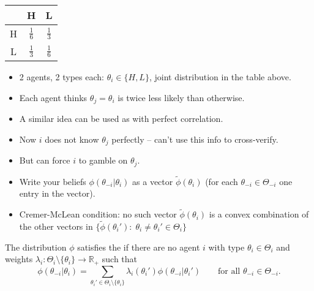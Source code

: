 \documentclass[english,handout,10pt]{beamer}		%
\def\lyxframeend{} %
\begin{document}
\begin{example}[2x2 example]
	\begin{center}
		\begin{tabular}{c | c | c |}
				& H 				& L					\\ \hline
			H	& $\frac{1}{6}$ 	& $\frac{1}{3}$ 	\\ \hline
			L	& $\frac{1}{3}$ 	& $\frac{1}{6}$		\\ \hline
		\end{tabular}
	\end{center}
	\begin{itemize}
		\item 2 agents, 2 types each: $\theta_i \in \{H,L\}$, joint distribution in the table above.
		\item Each agent thinks $\theta_j = \theta_i$ is twice less likely than otherwise. 
	\end{itemize}
\end{example}
\lyxframeend


\begin{itemize}
	\item A similar idea can be used as with perfect correlation.
	\item Now $i$ does not know $\theta_j$ perfectly -- can't use this info to cross-verify.
	\item But can force $i$ to gamble on $\theta_j$.
\end{itemize}
\lyxframeend


\begin{itemize}
	\item Write your beliefs $\phi(\theta_{-i}|\theta_i)$ as a vector $\tilde\phi(\theta_i)$ (for each $\theta_{-i}\in\Theta_{-i}$ one entry in the vector).
	\item Cremer-McLean condition: no such vector $\tilde\phi(\theta_i)$ is a convex combination of the other vectors in $\{\tilde\phi(\theta_i'):\;\theta_i\neq\theta_i'\in\Theta_i\}$
\end{itemize}

\begin{definition}[CM condition]
	The distribution $\phi$ satisfies the  if there are no agent $i$ with type $\theta_i\in\Theta_i$ and weights $\lambda_i: \Theta_i\setminus\{\theta_i\} \to \mathbb{R}_+$ such that
	\begin{equation*}
	\phi(\theta _{-i}|\theta _i)=\sum_{\theta _i'\in\Theta_i\setminus\{\theta_i\}}\lambda_i(\theta_i')\phi(\theta_{-i}|\theta_i')\qquad\text{for all }\theta_{-i}\in\Theta_{-i}.
	\end{equation*}
\end{definition}
\lyxframeend
\end{document}
